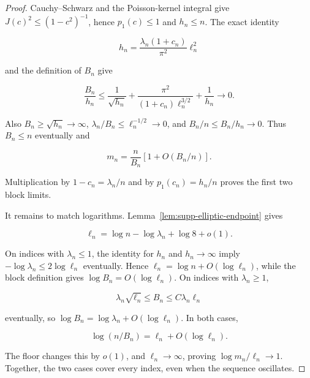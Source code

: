 \begin{proof}
Cauchy--Schwarz and the Poisson-kernel integral give
\(J(c)^2\le(1-c^2)^{-1}\), hence \(p_1(c)\le1\) and \(h_n\le n\).
The exact identity

\[
 h_n=\frac{\lambda_n(1+c_n)}{\pi^2}\ell_n^2
\]

and the definition of \(B_n\) give

\[
 \frac{B_n}{h_n}
 \le \frac{1}{\sqrt{h_n}}
 +\frac{\pi^2}{(1+c_n)\ell_n^{3/2}}
 +\frac{1}{h_n}\longrightarrow0.
\]

Also \(B_n\ge\sqrt{h_n}\to\infty\),
\(\lambda_n/B_n\le\ell_n^{-1/2}\to0\), and
\(B_n/n\le B_n/h_n\to0\).  Thus \(B_n\le n\) eventually and

\[
 m_n=\frac n{B_n}[1+O(B_n/n)].
\]

Multiplication by \(1-c_n=\lambda_n/n\) and by
\(p_1(c_n)=h_n/n\) proves the first two block limits.

It remains to match logarithms. Lemma~\ref{lem:supp-elliptic-endpoint} gives

\[
 \ell_n=\log n-\log\lambda_n+\log8+o(1).
\]

On indices with \(\lambda_n\le1\), the identity for \(h_n\) and
\(h_n\to\infty\) imply
\(-\log\lambda_n\le2\log\ell_n\) eventually.  Hence
\(\ell_n=\log n+O(\log\ell_n)\), while the block definition gives
\(\log B_n=O(\log\ell_n)\).  On indices with \(\lambda_n\ge1\),

\[
 \lambda_n\sqrt{\ell_n}\le B_n
 \le C\lambda_n\ell_n
\]

eventually, so
\(\log B_n=\log\lambda_n+O(\log\ell_n)\).  In both cases,

\[
 \log(n/B_n)=\ell_n+O(\log\ell_n).
\]

The floor changes this by \(o(1)\), and \(\ell_n\to\infty\), proving
\(\log m_n/\ell_n\to1\). Together, the two cases cover every index, even when
the sequence oscillates.
\end{proof}

